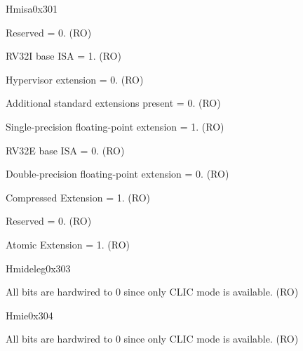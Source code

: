 \begin{register}{H}{misa}{0x301}
\begin{regdesc}
\begin{reglist}
\label{fielddesc:MISAJ}\item [J] Reserved = 0.  (RO)
\label{fielddesc:MISAI}\item [I] RV32I base ISA = 1. (RO)
\label{fielddesc:MISAH}\item [H] Hypervisor extension = 0. (RO)
\label{fielddesc:MISAG}\item [G] Additional standard extensions present = 0. (RO)
\label{fielddesc:MISAF}\item [F] Single-precision floating-point extension = 1. (RO)
\label{fielddesc:MISAE}\item [E] RV32E base ISA = 0. (RO)
\label{fielddesc:MISAD}\item [D] Double-precision floating-point extension = 0. (RO)
\label{fielddesc:MISAC}\item [C] Compressed Extension = 1. (RO)
\label{fielddesc:MISAB}\item [B] Reserved = 0. (RO)
\label{fielddesc:MISAA}\item [A] Atomic Extension = 1. (RO)
\end{reglist}\end{regdesc}
\end{register}

\begin{register}{H}{mideleg}{0x303}\label{regdesc:MIDELEG_REG}
%
\regnewline%
\begin{regdesc}\begin{reglist}
\label{fielddesc:MIDELEG}\item [{mideleg}] All bits are hardwired to 0 since only CLIC mode is available. (RO)
\end{reglist}\end{regdesc}
\end{register}

\begin{register}{H}{mie}{0x304}\label{regdesc:MIE_REG}
%
\regnewline%
\begin{regdesc}\begin{reglist}
\label{fielddesc:MIE}\item [{mie}] All bits are hardwired to 0 since only CLIC mode is available. (RO)
\end{reglist}\end{regdesc}
\end{register}


